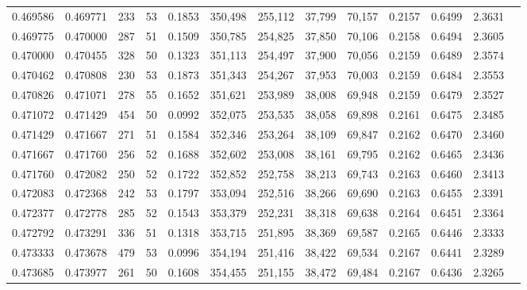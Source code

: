 \begin{tabular}{rrrrrrrrrrrrr}
0.469586 & 0.469771 &    233 &    53 &                                     0.1853 & 350,498 & 255,112 &  37,799 &  70,157 & 0.2157 & 0.6499 & 2.3631 \\
0.469775 & 0.470000 &    287 &    51 &                                     0.1509 & 350,785 & 254,825 &  37,850 &  70,106 & 0.2158 & 0.6494 & 2.3605 \\
0.470000 & 0.470455 &    328 &    50 &                                     0.1323 & 351,113 & 254,497 &  37,900 &  70,056 & 0.2159 & 0.6489 & 2.3574 \\
0.470462 & 0.470808 &    230 &    53 &                                     0.1873 & 351,343 & 254,267 &  37,953 &  70,003 & 0.2159 & 0.6484 & 2.3553 \\
0.470826 & 0.471071 &    278 &    55 &                                     0.1652 & 351,621 & 253,989 &  38,008 &  69,948 & 0.2159 & 0.6479 & 2.3527 \\
0.471072 & 0.471429 &    454 &    50 &                                     0.0992 & 352,075 & 253,535 &  38,058 &  69,898 & 0.2161 & 0.6475 & 2.3485 \\
0.471429 & 0.471667 &    271 &    51 &                                     0.1584 & 352,346 & 253,264 &  38,109 &  69,847 & 0.2162 & 0.6470 & 2.3460 \\
0.471667 & 0.471760 &    256 &    52 &                                     0.1688 & 352,602 & 253,008 &  38,161 &  69,795 & 0.2162 & 0.6465 & 2.3436 \\
0.471760 & 0.472082 &    250 &    52 &                                     0.1722 & 352,852 & 252,758 &  38,213 &  69,743 & 0.2163 & 0.6460 & 2.3413 \\
0.472083 & 0.472368 &    242 &    53 &                                     0.1797 & 353,094 & 252,516 &  38,266 &  69,690 & 0.2163 & 0.6455 & 2.3391 \\
0.472377 & 0.472778 &    285 &    52 &                                     0.1543 & 353,379 & 252,231 &  38,318 &  69,638 & 0.2164 & 0.6451 & 2.3364 \\
0.472792 & 0.473291 &    336 &    51 &                                     0.1318 & 353,715 & 251,895 &  38,369 &  69,587 & 0.2165 & 0.6446 & 2.3333 \\
0.473333 & 0.473678 &    479 &    53 &                                     0.0996 & 354,194 & 251,416 &  38,422 &  69,534 & 0.2167 & 0.6441 & 2.3289 \\
0.473685 & 0.473977 &    261 &    50 &                                     0.1608 & 354,455 & 251,155 &  38,472 &  69,484 & 0.2167 & 0.6436 & 2.3265 \\

\end{tabular}
